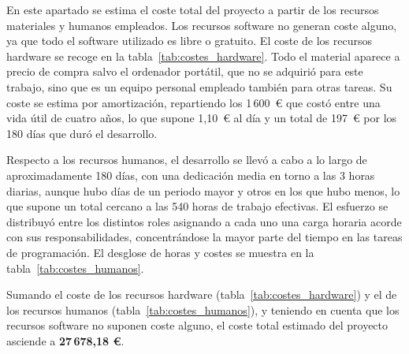 En este apartado se estima el coste total del proyecto a partir de los recursos materiales y humanos empleados. Los recursos software no generan coste alguno, ya que todo el software utilizado es libre o gratuito. 
%
El coste de los recursos hardware se recoge en la tabla~\ref{tab:costes_hardware}. Todo el material aparece a precio de compra salvo el ordenador portátil, que no se adquirió para este trabajo, sino que es un equipo personal empleado también para otras tareas. Su coste se estima por amortización, repartiendo los 1\,600~\euro{} que costó entre una vida útil de cuatro años, lo que supone 1,10~\euro{} al día y un total de 197~\euro{} por los 180 días que duró el desarrollo.

Respecto a los recursos humanos, el desarrollo se llevó a cabo a lo largo de aproximadamente 180 días, con una dedicación media en torno a las 3 horas diarias, aunque hubo días de un periodo mayor y otros en los que hubo menos, lo que supone un total cercano a las 540 horas de trabajo efectivas. El esfuerzo se distribuyó entre los distintos roles asignando a cada uno una carga horaria acorde con sus responsabilidades, concentrándose la mayor parte del tiempo en las tareas de programación. El desglose de horas y costes se muestra en la tabla~\ref{tab:costes_humanos}.

Sumando el coste de los recursos hardware (tabla~\ref{tab:costes_hardware}) y el de los recursos humanos (tabla~\ref{tab:costes_humanos}), y teniendo en cuenta que los recursos software no suponen coste alguno, el coste total estimado del proyecto asciende a \textbf{27\,678{,}18 \euro}.